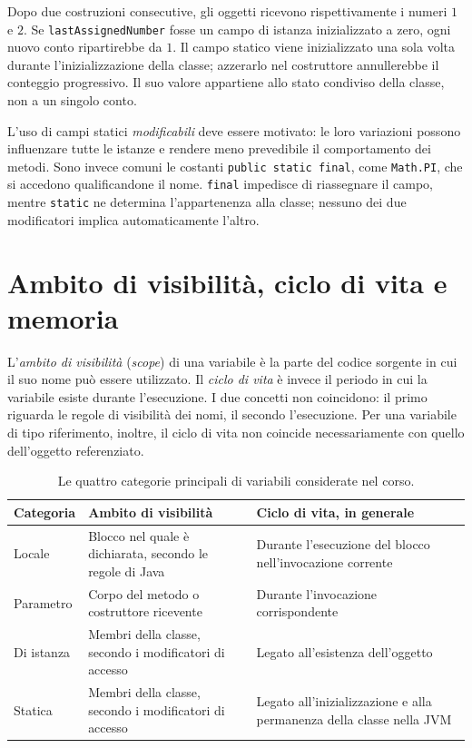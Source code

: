 Dopo due costruzioni consecutive, gli oggetti ricevono
rispettivamente i numeri \(1\) e \(2\). Se
\texttt{lastAssignedNumber} fosse un campo di istanza
inizializzato a zero, ogni nuovo conto ripartirebbe da \(1\).
Il campo statico viene inizializzato una sola volta durante
l'inizializzazione della classe; azzerarlo nel costruttore
annullerebbe il conteggio progressivo. Il suo valore appartiene
allo stato condiviso della classe, non a un singolo conto.

L'uso di campi statici \emph{modificabili} deve essere motivato:
le loro variazioni possono influenzare tutte le istanze e
rendere meno prevedibile il comportamento dei metodi. Sono
invece comuni le costanti \texttt{public static final}, come
\texttt{Math.PI}, che si accedono qualificandone il nome.
\texttt{final} impedisce di riassegnare il campo, mentre
\texttt{static} ne determina l'appartenenza alla classe;
nessuno dei due modificatori implica automaticamente l'altro.

\clearpage

\section{Ambito di visibilità, ciclo di vita e memoria}
\label{sec:fi-java-cicli-scope}

L'\emph{ambito di visibilità} (\emph{scope}) di una variabile è la
parte del codice sorgente in cui il suo nome può essere utilizzato.
Il \emph{ciclo di vita} è invece il periodo in cui la variabile
esiste durante l'esecuzione. I due concetti non coincidono: il primo
riguarda le regole di visibilità dei nomi, il secondo l'esecuzione.
Per una variabile di tipo riferimento, inoltre, il ciclo di vita
non coincide necessariamente con quello dell'oggetto referenziato.

\begin{table}[htbp]
\centering
\small
\begin{tabular}{p{2.45cm}p{5.2cm}p{5.0cm}}
\toprule
Categoria & Ambito di visibilità & Ciclo di vita, in generale \\
\midrule
Locale & Blocco nel quale è dichiarata, secondo le regole di Java & Durante l'esecuzione del blocco nell'invocazione corrente \\
Parametro & Corpo del metodo o costruttore ricevente & Durante l'invocazione corrispondente \\
Di istanza & Membri della classe, secondo i modificatori di accesso & Legato all'esistenza dell'oggetto \\
Statica & Membri della classe, secondo i modificatori di accesso & Legato all'inizializzazione e alla permanenza della classe nella JVM \\
\bottomrule
\end{tabular}
\caption{Le quattro categorie principali di variabili considerate nel corso.}
\label{tab:fi-java-cicli-variabili}
\end{table}


